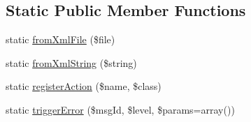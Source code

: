 \subsection*{Static Public Member Functions}
\begin{DoxyCompactItemize}
\item 
static \hyperlink{class_console___command_line_a3e1515970d74fe0a779def6f95026e47}{fromXmlFile} (\$file)
\item 
static \hyperlink{class_console___command_line_af00a0bd2cb31659e6bbc86d9f2d68e2a}{fromXmlString} (\$string)
\item 
static \hyperlink{class_console___command_line_a9da001bf263df32bd49d259b5e42a294}{registerAction} (\$name, \$class)
\item 
static \hyperlink{class_console___command_line_a7d983b16c2cb57cefa229686c486a8f9}{triggerError} (\$msgId, \$level, \$params=array())
\end{DoxyCompactItemize}
